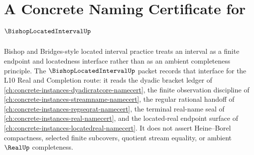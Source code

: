 \chapter{A Concrete Naming Certificate for $\BishopLocatedIntervalUp$}
\label{ch:concrete-instances-bishop-located-interval-namecert}

Bishop and Bridges-style located interval practice treats an interval as a finite endpoint and locatedness interface rather than as an ambient completeness principle. The $\BishopLocatedIntervalUp$ packet records that interface for the L10 Real and Completion route: it reads the dyadic bracket ledger of \autoref{ch:concrete-instances-dyadicratcore-namecert}, the finite observation discipline of \autoref{ch:concrete-instances-streamname-namecert}, the regular rational handoff of \autoref{ch:concrete-instances-regseqrat-namecert}, the terminal real-name seal of \autoref{ch:concrete-instances-real-namecert}, and the located-real endpoint surface of \autoref{ch:concrete-instances-locatedreal-namecert}. It does not assert Heine--Borel compactness, selected finite subcovers, quotient stream equality, or ambient $\RealUp$ completeness.

